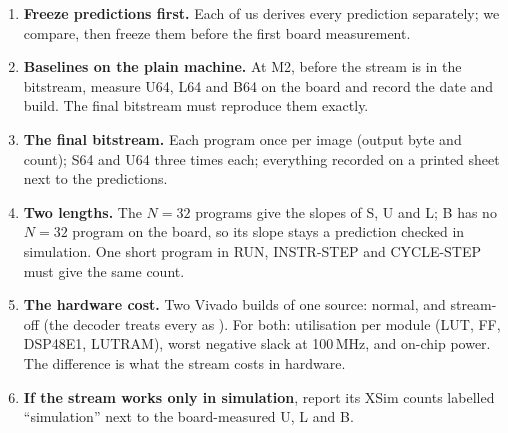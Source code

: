 \begin{enumerate}[leftmargin=1.6em]
\item \textbf{Freeze predictions first.} Each of us derives every prediction separately; we compare, then freeze them before the first board measurement.
\item \textbf{Baselines on the plain machine.} At M2, before the stream is in the bitstream, measure U64, L64 and B64 on the board and record the date and build. The final bitstream must reproduce them exactly.
\item \textbf{The final bitstream.} Each program once per image (output byte and count); S64 and U64 three times each; everything recorded on a printed sheet next to the predictions.
\item \textbf{Two lengths.} The $N = 32$ programs give the slopes of S, U and L; B has no $N = 32$ program on the board, so its slope stays a prediction checked in simulation. One short program in RUN, INSTR-STEP and CYCLE-STEP must give the same count.
\item \textbf{The hardware cost.} Two Vivado builds of one source: normal, and stream-off (the decoder treats every  as ). For both: utilisation per module (LUT, FF, DSP48E1, LUTRAM), worst negative slack at 100\,MHz, and on-chip power. The difference is what the stream costs in hardware.
\item \textbf{If the stream works only in simulation}, report its XSim counts labelled ``simulation'' next to the board-measured U, L and B.
\end{enumerate}
